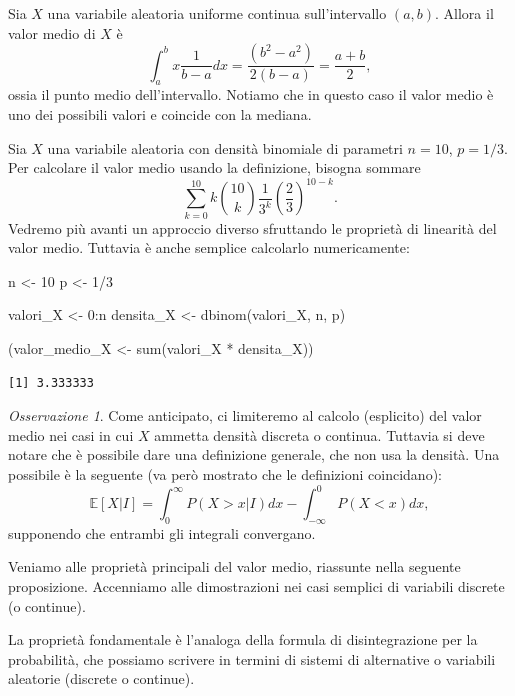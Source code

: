 \documentclass[
  italian,
  letterpaper,
]{book}
\newenvironment{Shaded}{\begin{snugshade}}{\end{snugshade}}
\newcommand{\DecValTok}[1]{\textcolor[rgb]{0.68,0.00,0.00}{#1}}
\newcommand{\FunctionTok}[1]{\textcolor[rgb]{0.28,0.35,0.67}{#1}}
\newcommand{\NormalTok}[1]{\textcolor[rgb]{0.00,0.23,0.31}{#1}}
\newcommand{\OtherTok}[1]{\textcolor[rgb]{0.00,0.23,0.31}{#1}}
\newcommand{\SpecialCharTok}[1]{\textcolor[rgb]{0.37,0.37,0.37}{#1}}
\newcommand{\bra}[1]{\left( #1 \right)}
\newcommand{\sqa}[1]{\left[ #1 \right]}
\newcommand{\E}[1]{\mathbb{E}\sqa{#1}}
\theoremstyle{definition}
\theoremstyle{remark}
\newtheorem*{remark}{Osservazione}
\begin{document}
Sia \(X\) una variabile aleatoria uniforme continua sull'intervallo
\((a,b)\). Allora il valor medio di \(X\) è
\[  \int_a^b x \frac{1}{b-a} dx  = \frac{( b^2-a^2)}{2 (b-a)} = \frac{a+b}{2},\]
ossia il punto medio dell'intervallo. Notiamo che in questo caso il
valor medio è uno dei possibili valori e coincide con la mediana.

Sia \(X\) una variabile aleatoria con densità binomiale di parametri
\(n=10\), \(p=1/3\). Per calcolare il valor medio usando la definizione,
bisogna sommare
\[ \sum_{k=0}^{10} k {10 \choose k} \frac{1}{3^{k}} \bra{\frac{2}{3}}^{10-k}.\]
Vedremo più avanti un approccio diverso sfruttando le proprietà di
linearità del valor medio. Tuttavia è anche semplice calcolarlo
numericamente:

\begin{Shaded}
\begin{Highlighting}[]
\NormalTok{n }\OtherTok{\textless{}{-}} \DecValTok{10}
\NormalTok{p }\OtherTok{\textless{}{-}} \DecValTok{1}\SpecialCharTok{/}\DecValTok{3}

\NormalTok{valori\_X }\OtherTok{\textless{}{-}} \DecValTok{0}\SpecialCharTok{:}\NormalTok{n}
\NormalTok{densita\_X }\OtherTok{\textless{}{-}} \FunctionTok{dbinom}\NormalTok{(valori\_X, n, p)}

\NormalTok{(valor\_medio\_X }\OtherTok{\textless{}{-}} \FunctionTok{sum}\NormalTok{(valori\_X }\SpecialCharTok{*}\NormalTok{ densita\_X))}
\end{Highlighting}
\end{Shaded}

\begin{verbatim}
[1] 3.333333
\end{verbatim}

\begin{remark}
Come anticipato, ci limiteremo al calcolo (esplicito) del valor medio
nei casi in cui \(X\) ammetta densità discreta o continua. Tuttavia si
deve notare che è possibile dare una definizione generale, che non usa
la densità. Una possibile è la seguente (va però mostrato che le
definizioni coincidano):
\[ \E{X |I} = \int_0^\infty P(X>x|I) d x - \int_{-\infty}^0 P(X <x) dx, \]
supponendo che entrambi gli integrali convergano.
\end{remark}

Veniamo alle proprietà principali del valor medio, riassunte nella
seguente proposizione. Accenniamo alle dimostrazioni nei casi semplici
di variabili discrete (o continue).

La proprietà fondamentale è l'analoga della formula di disintegrazione
per la probabilità, che possiamo scrivere in termini di sistemi di
alternative o variabili aleatorie (discrete o continue).
\end{document}
